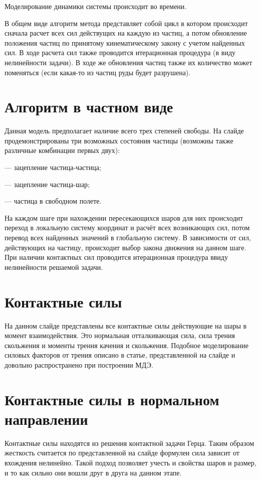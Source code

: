\documentclass[a4paper]{article}
\begin{document}
Моделирование динамики системы происходит во времени.

В общем виде алгоритм метода представляет собой цикл в котором происходит сначала расчет всех сил действущих на каждую из частиц, а потом обновление положения частиц по принятому кинематическому закону с учетом найденных сил.
В ходе расчета сил также проводится итерационная процедура (в виду нелинейности задачи).
В ходе же обновления частиц также их количество может поменяться (если какая-то из частиц руды будет разрушена).



\section{Алгоритм в частном виде}
Данная модель предполагает наличие всего трех степеней свободы.
На слайде продемонстрированы три возможных состояния частицы (возможны также различные комбинации первых двух):

--- зацепление частица-частица;

--- зацепление частица-шар;

--- частица в свободном полете.

На каждом шаге при нахождении пересекающихся шаров для них происходит переход в локальную систему координат и расчёт всех возникающих сил, потом перевод всех найденных значений в глобальную систему.
В зависимости от сил, действующих на частицу, происходит выбор закона движения на данном шаге.
При наличии контактных сил проводится итерационная процедура ввиду нелинейности решаемой задачи.


\section{Контактные силы}
На данном слайде представлены все контактные силы действующие на шары в момент взаимодействия.
Это нормальная отталкивающая сила, сила трения скольжения и моменты трения качения и скольжения.
Подобное моделирование силовых факторов от трения описано в статье, представленной на слайде и довольно распространено при построении МДЭ.

\section{Контактные силы в нормальном направлении}

Контактные силы находятся из решения контактной задачи Герца.
Таким образом жесткость считается по представленной на слайде формулеи сила зависит от вхождения нелинейно.
Такой подход позволяет учесть и свойства шаров и размер, и то как сильно они вошли друг в друга на данном этапе.
\end{document}
